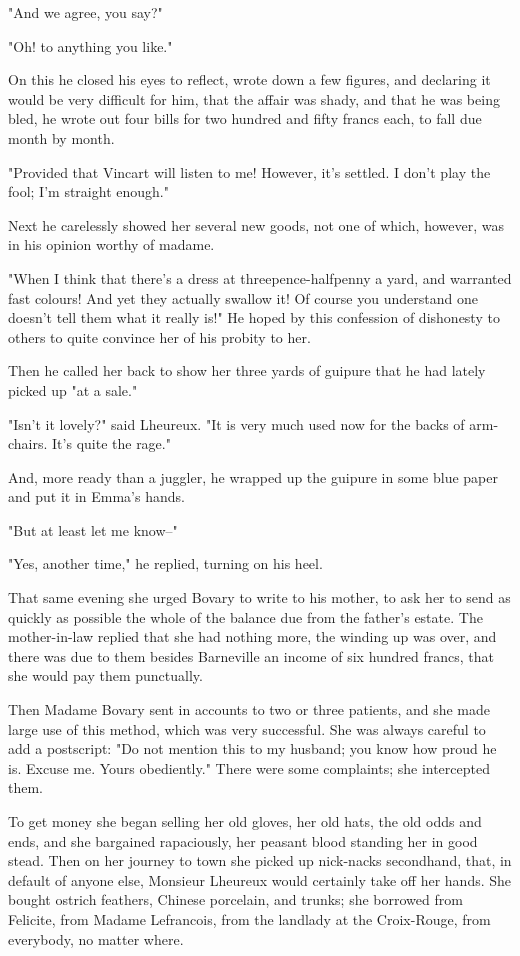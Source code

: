 \documentclass{tufte-book}
\begin{document}
"And we agree, you say?"

"Oh! to anything you like."

On this he closed his eyes to reflect, wrote down a few figures, and
declaring it would be very difficult for him, that the affair was shady,
and that he was being bled, he wrote out four bills for two hundred and
fifty francs each, to fall due month by month.

"Provided that Vincart will listen to me! However, it's settled. I don't
play the fool; I'm straight enough."

Next he carelessly showed her several new goods, not one of which,
however, was in his opinion worthy of madame.

"When I think that there's a dress at threepence-halfpenny a yard, and
warranted fast colours! And yet they actually swallow it! Of course you
understand one doesn't tell them what it really is!" He hoped by this
confession of dishonesty to others to quite convince her of his probity
to her.

Then he called her back to show her three yards of guipure that he had
lately picked up "at a sale."

"Isn't it lovely?" said Lheureux. "It is very much used now for the
backs of arm-chairs. It's quite the rage."

And, more ready than a juggler, he wrapped up the guipure in some blue
paper and put it in Emma's hands.

"But at least let me know--"

"Yes, another time," he replied, turning on his heel.

That same evening she urged Bovary to write to his mother, to ask her
to send as quickly as possible the whole of the balance due from the
father's estate. The mother-in-law replied that she had nothing more,
the winding up was over, and there was due to them besides Barneville an
income of six hundred francs, that she would pay them punctually.

Then Madame Bovary sent in accounts to two or three patients, and she
made large use of this method, which was very successful. She was always
careful to add a postscript: "Do not mention this to my husband; you
know how proud he is. Excuse me. Yours obediently." There were some
complaints; she intercepted them.

To get money she began selling her old gloves, her old hats, the old
odds and ends, and she bargained rapaciously, her peasant blood standing
her in good stead. Then on her journey to town she picked up nick-nacks
secondhand, that, in default of anyone else, Monsieur Lheureux would
certainly take off her hands. She bought ostrich feathers, Chinese
porcelain, and trunks; she borrowed from Felicite, from Madame
Lefrancois, from the landlady at the Croix-Rouge, from everybody, no
matter where.
\end{document}
